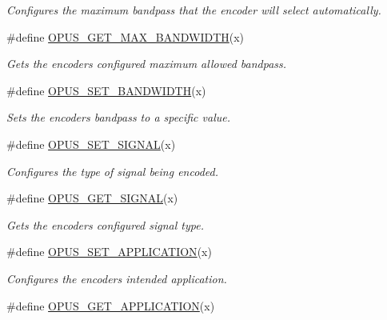 \begin{DoxyCompactItemize}
\begin{DoxyCompactList}\small\item\em Configures the maximum bandpass that the encoder will select automatically. \end{DoxyCompactList}\item 
\#define \hyperlink{group__opus__encoderctls_gaa3b5736de64792e1144ce12dfb87613c}{O\+P\+U\+S\+\_\+\+G\+E\+T\+\_\+\+M\+A\+X\+\_\+\+B\+A\+N\+D\+W\+I\+D\+TH}(x)
\begin{DoxyCompactList}\small\item\em Gets the encoder\textquotesingle{}s configured maximum allowed bandpass. \end{DoxyCompactList}\item 
\#define \hyperlink{group__opus__encoderctls_ga0178dabe5526d5b0667d81489cc93791}{O\+P\+U\+S\+\_\+\+S\+E\+T\+\_\+\+B\+A\+N\+D\+W\+I\+D\+TH}(x)
\begin{DoxyCompactList}\small\item\em Sets the encoder\textquotesingle{}s bandpass to a specific value. \end{DoxyCompactList}\item 
\#define \hyperlink{group__opus__encoderctls_gaaa87ccee4ae46aa6c9528e03c5122b89}{O\+P\+U\+S\+\_\+\+S\+E\+T\+\_\+\+S\+I\+G\+N\+AL}(x)
\begin{DoxyCompactList}\small\item\em Configures the type of signal being encoded. \end{DoxyCompactList}\item 
\#define \hyperlink{group__opus__encoderctls_ga640d434de535e2d2caec991c347303a4}{O\+P\+U\+S\+\_\+\+G\+E\+T\+\_\+\+S\+I\+G\+N\+AL}(x)
\begin{DoxyCompactList}\small\item\em Gets the encoder\textquotesingle{}s configured signal type. \end{DoxyCompactList}\item 
\#define \hyperlink{group__opus__encoderctls_ga18fa17dae52ff8f3eaea314204bf1a36}{O\+P\+U\+S\+\_\+\+S\+E\+T\+\_\+\+A\+P\+P\+L\+I\+C\+A\+T\+I\+ON}(x)
\begin{DoxyCompactList}\small\item\em Configures the encoder\textquotesingle{}s intended application. \end{DoxyCompactList}\item 
\#define \hyperlink{group__opus__encoderctls_ga062ebbc209caf6832fe4a309a459fd4c}{O\+P\+U\+S\+\_\+\+G\+E\+T\+\_\+\+A\+P\+P\+L\+I\+C\+A\+T\+I\+ON}(x)

\end{DoxyCompactItemize}
